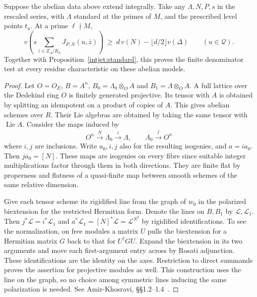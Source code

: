 \begin{theorem}
\label{intjet:trace}
Suppose the abelian data above extend integrally. Take any
\(\Lambda,N,P,s\) in the rescaled series, with \(\Lambda\) standard
at the primes of \(M\), and the prescribed level points \(t_u\).
At a prime \(\ell\nmid M\),
\[
 v\left(s\sum_{\bar z\in Z_\Lambda/K_0}J_{P,N}(u,\bar z)\right)
 \ \ge\ d\,v(N)-\lfloor d/2\rfloor v(\Delta)
 \qquad(u\in\mathcal Q).
\]
Together with Proposition~\ref{intjet:standard}, this proves the
finite denominator test at every residue characteristic on these
abelian models.
\end{theorem}
\begin{proof}
Let \(O=O_E\), \(B=A^n\), \(B_0=\Lambda_0\otimes_O A\) and
\(B_1=\Lambda\otimes_O A\). A full lattice over the Dedekind
ring \(O\) is finitely generated projective. Its tensor with \(A\)
is obtained by splitting an idempotent on a product of copies of
\(A\). This gives abelian schemes over \(R\). Their Lie algebras
are obtained by taking the same tensor with \(\operatorname{Lie}A\).
Consider the maps induced by
\[
 O^n\xrightarrow{\,N\,}\Lambda_0
 \xrightarrow{\,i\,}\Lambda,\qquad
 \Lambda_0\xrightarrow{\,j\,}O^n
\]
where \(i,j\) are inclusions. Write \(a_0,i,j\) also for the
resulting isogenies, and \(a=i a_0\). Then \(j a_0=[N]\).
These maps are isogenies on every fibre since suitable integer
multiplications factor through them in both directions. They
are finite flat by properness and flatness of a quasi-finite map
between smooth schemes of the same relative dimension.

Give each tensor scheme its rigidified line from the graph of
\(w_0\) in the polarized biextension for the restricted Hermitian
form. Denote the lines on \(B,B_1\) by \(\mathcal L,\mathcal L_1\).
Then \(j^*\mathcal L=i^*\mathcal L_1\) and
\(a^*\mathcal L_1=[N]^*\mathcal L=\mathcal L^{N^2}\)
by rigidified identifications. To see the normalization, on free
modules a matrix \(U\) pulls the biextension for a Hermitian
matrix \(G\) back to that for \(U^\dagger G U\). Expand the
biextension in its two arguments and move each first-argument
entry across by Rosati adjunction. These identifications are
the identity on the axes. Restriction to direct summands proves
the assertion for projective modules as well. This construction
uses the line on the graph, so no choice among symmetric lines
inducing the same polarization is needed. See Amir-Khosravi,
\S\S1.2--1.4~\cite{serreTensor}.


\end{proof}
